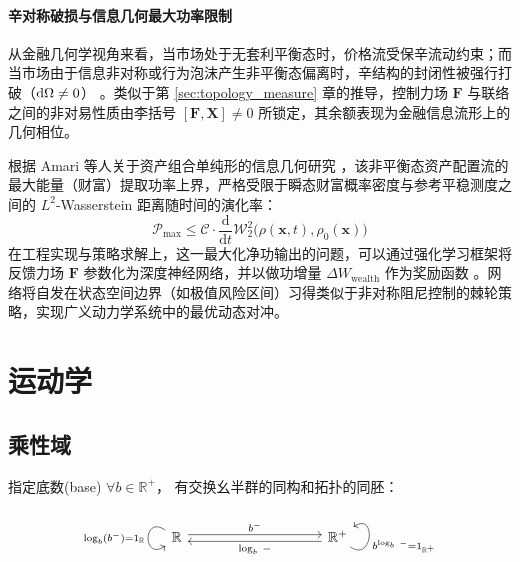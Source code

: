 ﻿\documentclass[10pt,a4paper]{article}
\numberwithin{equation}{section}
\begin{document}
\paragraph{辛对称破损与信息几何最大功率限制}
从金融几何学视角来看，当市场处于无套利平衡态时，价格流受保辛流动约束；而当市场由于信息非对称或行为泡沫产生非平衡态偏离时，辛结构的封闭性被强行打破（$\text d\Omega \neq 0$） \cite{Imkeller2010Geometry}。类似于第 \ref{sec:topology_measure} 章的推导，控制力场 $\mathbf F$ 与联络之间的非对易性质由李括号 $[\mathbf F, \mathbf X] \neq 0$ 所锁定，其余额表现为金融信息流形上的几何相位。

根据 Amari 等人关于资产组合单纯形的信息几何研究 \cite{Amari2020Information}，该非平衡态资产配置流的最大能量（财富）提取功率上界，严格受限于瞬态财富概率密度与参考平稳测度之间的 $L^2$-Wasserstein 距离随时间的演化率：
\begin{equation}
    \mathcal{P}_{\max} \le \mathcal{C} \cdot \frac{\mathrm{d}}{\mathrm{d}t} \mathcal{W}_2^2\big(\rho(\mathbf x, t), \rho_0(\mathbf x)\big)
\end{equation}
在工程实现与策略求解上，这一最大化净功输出的问题，可以通过强化学习框架将反馈力场 $\mathbf F$ 参数化为深度神经网络，并以做功增量 $\Delta W_{\text{wealth}}$ 作为奖励函数 \cite{Gu2020Empirical}。网络将自发在状态空间边界（如极值风险区间）习得类似于非对称阻尼控制的棘轮策略，实现广义动力学系统中的最优动态对冲。

\section{运动学}

\subsection{乘性域}

指定底数(base) $\forall b\in\mathbb R^+$，
有交换幺半群的同构和拓扑的同胚：

$$
\begin{tikzcd}
\mathbb R \arrow[rrrr, "b^-", shift left] \arrow["\text{log}_b(b^-) = 1_\mathbb R"', loop, distance=2em, in=215, out=145] &  &  &  & \mathbb R^+ \arrow[llll, "\text{log}_b \ -", shift left] \arrow["b^{\text{log}_b \ -} = 1_{\mathbb R^+}"', loop, distance=2em, in=35, out=325]
\end{tikzcd}
$$
\end{document}
